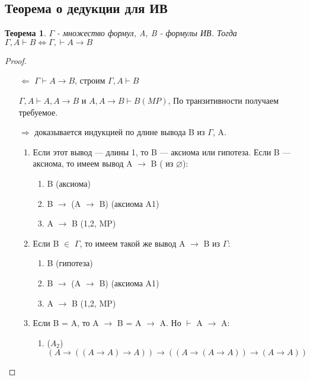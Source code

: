 \documentclass[a4paper]{article}
\newtheorem{theorem}{Теорема}[section]
\theoremstyle{definition}
\theoremstyle{remark}
\begin{document}
    \subsection{Теорема о дедукции для ИВ}
    \begin{theorem}
        $\Gamma$ - множество формул, A, B - формулы ИВ. Тогда
        $\Gamma, A\vdash B \Leftrightarrow \Gamma, \vdash A\rightarrow B$
    \end{theorem}
    \begin{proof}
        \begin{itemize}
            \item[$\Leftarrow$]$\Gamma \vdash A\rightarrow B$, строим $\Gamma, A\vdash B$
            
            $\Gamma,  A\vdash A, A\rightarrow B$ и $A, A\rightarrow B \vdash B (MP)$,
            По транзитивности получаем требуемое.
            \item[$\Rightarrow$] 
            доказывается индукцией по длине вывода B из $\Gamma$, A.
            \begin{enumerate}
                \item Если этот вывод — длины 1, то B — аксиома или гипотеза. Если B
                — аксиома, то имеем вывод A $\rightarrow$ B ( из $\varnothing$):
                \begin{enumerate}
                    \item B (аксиома)
                    \item B $\rightarrow$ (A $\rightarrow$ B) (аксиома A1)
                    \item A $\rightarrow$ B (1,2, MP)
                \end{enumerate}
                \item Если B $\in$ $\Gamma$, то имеем такой же вывод A $\rightarrow$ B из $\Gamma$:
                \begin{enumerate}
                    \item B (гипотеза)
                    \item B $\rightarrow$ (A $\rightarrow$ B) (аксиома A1)
                    \item A $\rightarrow$ B (1,2, MP)
                \end{enumerate}
                \item Если B = A, то A $\rightarrow$ B = A $\rightarrow$ A. Но $\vdash$ A $\rightarrow$ A:
                    \begin{enumerate}
                        \item ($A_2$) $(A\rightarrow ((A\rightarrow A)\rightarrow A))\rightarrow ((A\rightarrow (A\rightarrow A))\rightarrow (A \rightarrow A))$ 

\end{enumerate}
\end{enumerate}
\end{itemize}
\end{proof}
\end{document}
